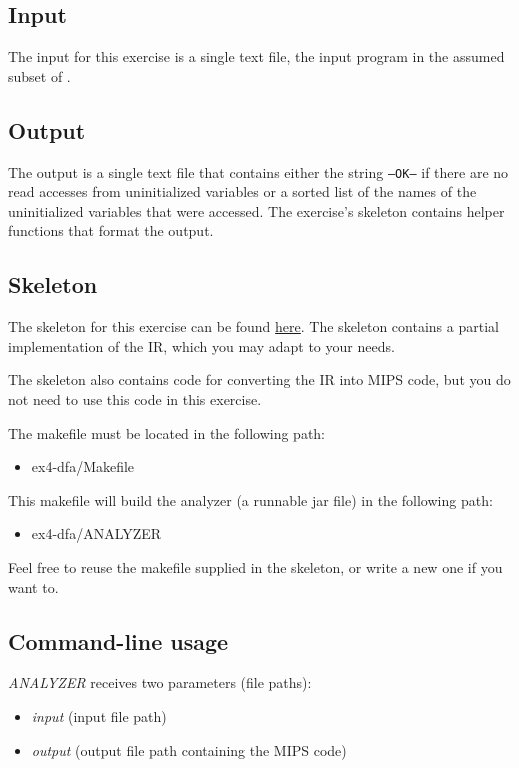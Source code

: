 \documentclass{article}
\begin{document}
\subsection{Input}
The input for this exercise is a single text file, the input program in the assumed subset of  \plname.

\subsection{Output}
The output is a single text file that contains either the string \texttt{--OK--}
if there are no read accesses from uninitialized variables or a sorted list of the names of the uninitialized variables that were accessed. The exercise's skeleton contains helper functions that format the output.

\subsection{Skeleton}
The skeleton for this exercise can be found \href{https://github.com/davidtr1037/compilation-tau/tree/master/src/ex4-dfa}{here}.
The skeleton contains a partial implementation of the IR, which you may adapt to your needs.

The skeleton also contains code for converting the IR into MIPS code, but you do not need to use this code in this exercise.

The makefile must be located in the following path:
\begin{itemize}
    \item ex4-dfa/Makefile
\end{itemize}
This makefile will build the analyzer (a runnable jar file) in the following path:
\begin{itemize}
    \item ex4-dfa/ANALYZER
\end{itemize}
Feel free to reuse the makefile supplied in the skeleton,
or write a new one if you want to.

\subsection{Command-line usage}
\textit{ANALYZER} receives two parameters (file paths):
\begin{itemize}
    \item \textit{input} (input file path)
    \item \textit{output} (output file path containing the MIPS code)
\end{itemize}
\end{document}
